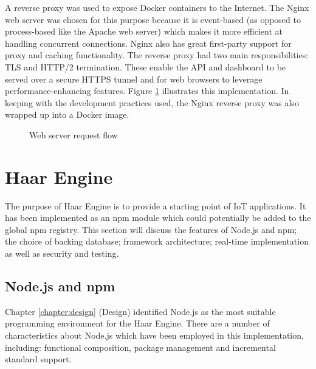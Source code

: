    A reverse proxy was used to expose Docker containers to the Internet. The Nginx web server was chosen for this purpose because it is event-based (as opposed to process-based like the Apache web server) which makes it more efficient at handling concurrent connections. Nginx also has great first-party support for proxy and caching functionality. The reverse proxy had two main responsibilities: TLS and HTTP/2 termination. These enable the API and dashboard to be served over a secure HTTPS tunnel and for web browsers to leverage performance-enhancing features. Figure \ref{figure:reverse-proxy} illustrates this implementation. In keeping with the development practices used, the Nginx reverse proxy was also wrapped up into a Docker image.

    \begin{figure}
      \centering
      \caption{Web server request flow}
      \label{figure:reverse-proxy}
    \end{figure}

  \section{Haar Engine}
    The purpose of Haar Engine is to provide a starting point of IoT applications. It has been implemented as an npm module which could potentially be added to the global npm registry. This section will discuss the features of Node.js and npm; the choice of backing database; framework architecture; real-time implementation as well as security and testing.

    \subsection{Node.js and npm}
      Chapter \ref{chapter:design} (Design) identified Node.js as the most suitable programming environment for the Haar Engine. There are a number of characteristics  about Node.js which have been employed in this implementation, including: functional composition, package management and incremental standard support.

